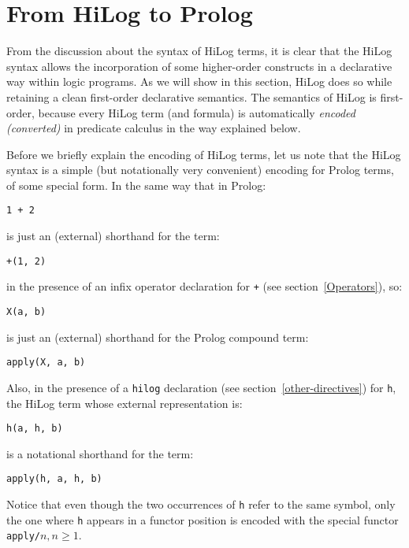 \section{From HiLog to Prolog} \label{HiLog2Prolog}
From the discussion about the syntax of HiLog terms, it is clear that the
HiLog syntax allows the incorporation of some higher-order constructs in
a declarative way within logic programs.  As we will show in this section,
HiLog does so  while retaining a clean first-order declarative semantics.
The semantics of HiLog is first-order, because every HiLog term (and formula)
is automatically {\em encoded (converted)} in predicate calculus in the way
explained below.

Before we briefly explain the encoding of HiLog terms, let us note that the 
HiLog syntax is a simple (but notationally very convenient) encoding for Prolog
terms, of some special form.  In the same way that in Prolog:
\begin{center}
{\tt	1 + 2}
\end{center}
is just an (external) shorthand for the term:
\begin{center}
{\tt  +(1, 2)} 
\end{center}
in the presence of an infix operator declaration for {\tt +} 
(see section~\ref{Operators}), so:
\begin{center}
{\tt  X(a, b)}
\end{center}
is just an (external) shorthand for the Prolog compound term:
\begin{center}
{\tt    apply(X, a, b)}
\end{center}
Also, in the presence of a {\tt hilog} declaration (see
section~\ref{other-directives}) for {\tt h}, the HiLog term whose external
representation is:
\begin{center}
{\tt  h(a, h, b)} 
\end{center}
is a notational shorthand for the term:
\begin{center}
{\tt apply(h, a, h, b)}
\end{center}
Notice that even though the two occurrences of {\tt h} refer to the same 
symbol, only the one where {\tt h} appears in a functor position is encoded
with the special functor {\tt apply/}$n, n \geq 1$.

